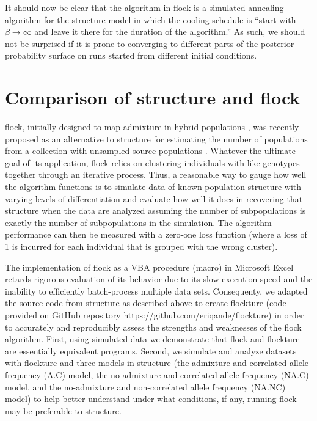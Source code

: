 It should now be clear that the algorithm in {\sc flock} is a simulated annealing 
algorithm for the {\sc structure} model in which the cooling schedule is
``start with $\beta\rightarrow\infty$ and leave it there for the duration of 
the algorithm.''  As such, we should not be surprised if it is prone 
to converging to different parts of the posterior probability surface on runs started
from different initial conditions.


\section*{Comparison of {\sc structure} and {\sc flock}}
{\sc flock}, initially designed to map admixture in hybrid populations 
\citep{Duc&Tur2009}, was recently proposed as an alternative to 
{\sc structure} for estimating the number of populations from a collection with 
unsampled source populations \citep{Duc&Tur2012}. Whatever the ultimate goal
of its application,  
{\sc flock} relies on clustering individuals with like genotypes together  
through an iterative process. Thus, a reasonable way 
to gauge how well the algorithm functions is to simulate data of known 
population structure with varying levels of differentiation and 
evaluate how well it does in recovering that structure when the data are
analyzed assuming
the number of subpopulations is exactly the number of subpopulations in the simulation. The 
algorithm performance can then be measured with a zero-one 
loss function (where a loss of 1 is incurred for each individual that is grouped with the wrong cluster).

The implementation of {\sc flock} as a VBA procedure (macro) in 
Microsoft Excel retards rigorous evaluation of its behavior due 
to its slow execution speed and 
the inability to efficiently batch-process multiple data sets. Consequenty, we adapted 
the source code from {\sc structure} as described above to create {\sc flockture}
(code provided on GitHub repository https://github.com/eriqande/flockture) 
in order to accurately and reproducibly assess the strengths and weaknesses of the {\sc flock} 
algorithm. First, using simulated data we demonstrate that {\sc flock} 
and {\sc flockture} are essentially equivalent programs.
Second, we simulate and analyze datasets with {\sc flockture} 
and three models in {\sc structure} (the admixture and correlated 
allele frequency (A.C) model, the no-admixture and correlated 
allele frequency (NA.C) model, and the no-admixture and non-correlated 
allele frequency (NA.NC) model) to help better understand
under what conditions, if any, running {\sc flock} may be preferable to {\sc structure}. 

